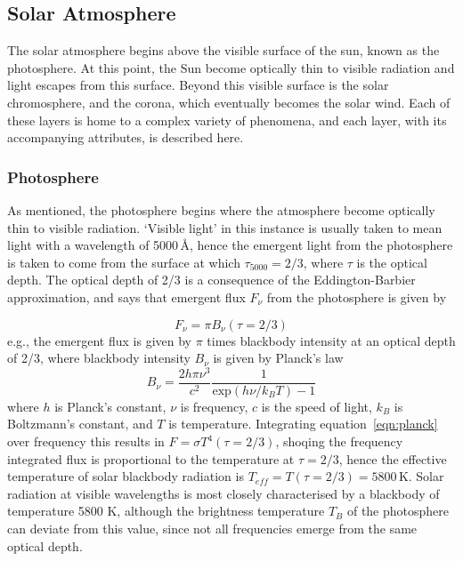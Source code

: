 

\subsection{Solar Atmosphere}\label{sec:12}

The solar atmosphere begins above the visible surface of the sun, known as the photosphere. At this point, the Sun become optically thin to visible radiation and light escapes from this surface. Beyond this visible surface is the solar chromosphere, and the corona, which eventually becomes the solar wind. Each of these layers is home to a complex variety of phenomena, and each layer, with its accompanying attributes, is described here.


\subsubsection{Photosphere}\label{sec:121}

As mentioned, the photosphere begins where the atmosphere become optically thin to visible radiation. \textquoteleft Visible light' in this instance is usually taken to mean light with a wavelength of 5000\,\AA, hence the emergent light from the photosphere is taken to come from the surface at which $\tau_{5000}=2/3$, where $\tau$ is the optical depth. The optical depth of 2/3 is a consequence of the Eddington-Barbier approximation, and says that emergent flux $F_{\nu}$ from the photosphere is given by

\begin{equation}
F_\nu = \pi B_\nu(\tau=2/3)
\end{equation}
e.g., the emergent flux is given by $\pi$ times blackbody intensity at an optical depth of 2/3, where blackbody intensity $B_\nu$ is given by Planck's law 
\begin{equation}
B_\nu = \frac{2h\pi\nu^3}{c^2}\frac{1}{\mathrm{exp}(h\nu/k_BT)-1}
\label{eqn:planck}
\end{equation}
where $h$ is Planck's constant, $\nu$ is frequency, $c$ is the speed of light, $k_B$ is Boltzmann's constant, and $T$ is temperature. Integrating equation~\ref{eqn:planck} over frequency this results in $F = \sigma T^4(\tau=2/3)$, shoqing the frequency integrated flux is proportional to the temperature at $\tau=2/3$, hence the effective temperature of solar blackbody radiation is $T_{eff}=T(\tau=2/3)=5800$\,K. Solar radiation at visible wavelengths is most closely characterised by a blackbody of temperature 5800 K, although the brightness temperature $T_B$ of the photosphere can deviate from this value, since not all frequencies emerge from the same optical depth.

